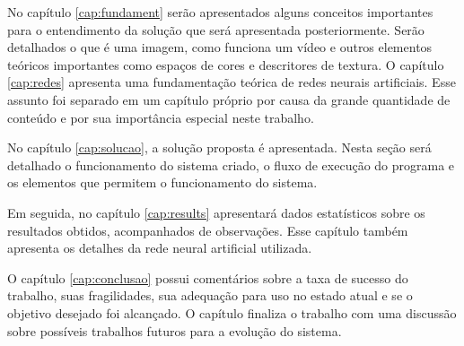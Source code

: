 			No capítulo \ref{cap:fundament} serão apresentados alguns conceitos importantes para o entendimento da solução que será apresentada posteriormente. Serão detalhados o que é uma imagem, como funciona um vídeo e outros elementos teóricos importantes como espaços de cores e descritores de textura. O capítulo \ref{cap:redes} apresenta uma fundamentação teórica de redes neurais artificiais. Esse assunto foi separado em um capítulo próprio por causa da grande quantidade de conteúdo e por sua importância especial neste trabalho.
			
			No capítulo \ref{cap:solucao}, a solução proposta é apresentada. Nesta seção será detalhado o funcionamento do sistema criado, o fluxo de execução do programa e os elementos que permitem o funcionamento do sistema.
			
			Em seguida, no capítulo \ref{cap:results} apresentará dados estatísticos sobre os resultados obtidos, acompanhados de observações. Esse capítulo também apresenta os detalhes da rede neural artificial utilizada.
			
			O capítulo \ref{cap:conclusao} possui comentários sobre a taxa de sucesso do trabalho, suas fragilidades, sua adequação para uso no estado atual e se o objetivo desejado foi alcançado. O capítulo finaliza o trabalho com uma discussão sobre possíveis trabalhos futuros para a evolução do sistema.\cite{de2006introduccao}
			
			








